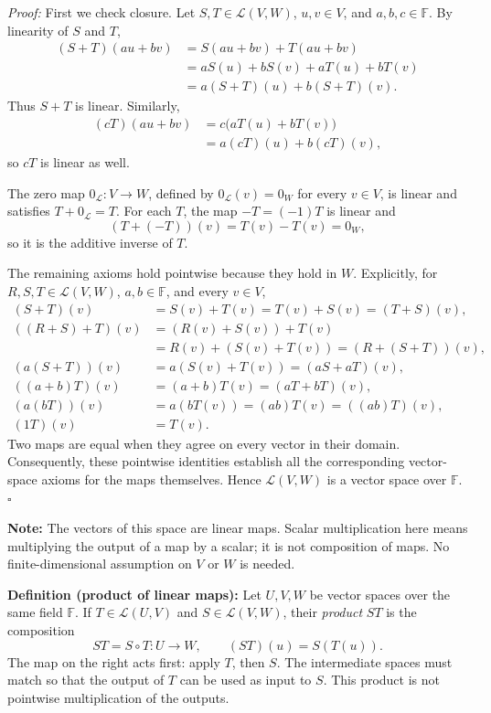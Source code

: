 \documentclass[a4paper,11pt,abstract=true]{scrartcl}
\theoremstyle{dotlessP}
\theoremstyle{dotlessS}
\theoremstyle{remark}
\theoremstyle{definition}
\begin{document}
\begin{claim_box}
\textit{Proof:} First we check closure. Let $S,T\in\mathcal{L}(V,W)$,
$u,v\in V$, and $a,b,c\in\mathbb{F}$. By linearity of $S$ and $T$,
\[
\begin{aligned}
(S+T)(au+bv)
&=S(au+bv)+T(au+bv)\\
&=aS(u)+bS(v)+aT(u)+bT(v)\\
&=a(S+T)(u)+b(S+T)(v).
\end{aligned}
\]
Thus $S+T$ is linear. Similarly,
\[
\begin{aligned}
(cT)(au+bv)
&=c\bigl(aT(u)+bT(v)\bigr)\\
&=a(cT)(u)+b(cT)(v),
\end{aligned}
\]
so $cT$ is linear as well.

The zero map $0_{\mathcal{L}}:V\longrightarrow W$, defined by
$0_{\mathcal{L}}(v)=0_W$ for every $v\in V$, is linear and satisfies
$T+0_{\mathcal{L}}=T$. For each $T$, the map $-T=(-1)T$ is linear and
\[
(T+(-T))(v)=T(v)-T(v)=0_W,
\]
so it is the additive inverse of $T$.

The remaining axioms hold pointwise because they hold in $W$. Explicitly,
for $R,S,T\in\mathcal{L}(V,W)$, $a,b\in\mathbb{F}$, and every $v\in V$,
\[
\begin{aligned}
(S+T)(v)&=S(v)+T(v)=T(v)+S(v)=(T+S)(v),\\
((R+S)+T)(v)&=(R(v)+S(v))+T(v)\\
&=R(v)+(S(v)+T(v))=(R+(S+T))(v),\\
(a(S+T))(v)&=a(S(v)+T(v))=(aS+aT)(v),\\
((a+b)T)(v)&=(a+b)T(v)=(aT+bT)(v),\\
(a(bT))(v)&=a(bT(v))=(ab)T(v)=((ab)T)(v),\\
(1T)(v)&=T(v).
\end{aligned}
\]
Two maps are equal when they agree on every vector in their domain.
Consequently, these pointwise identities establish all the corresponding
vector-space axioms for the maps themselves. Hence $\mathcal{L}(V,W)$ is
a vector space over $\mathbb{F}$. \hfill$\square$
\end{claim_box}

\begin{claim_box}
\textbf{Note:} The vectors of this space are linear maps.
Scalar multiplication here means multiplying the output of a map by a
scalar; it is not composition of maps. No finite-dimensional assumption
on $V$ or $W$ is needed.
\end{claim_box}

\begin{definition_box}
\textbf{Definition (product of linear maps):} Let $U,V,W$ be vector
spaces over the same field $\mathbb{F}$. If $T\in\mathcal{L}(U,V)$ and
$S\in\mathcal{L}(V,W)$, their \emph{product} $ST$ is the composition
\[
ST=S\circ T:U\longrightarrow W,
\qquad (ST)(u)=S(T(u)).
\]
The map on the right acts first: apply $T$, then $S$. The intermediate
spaces must match so that the output of $T$ can be used as input to $S$.
This product is not pointwise multiplication of the outputs.
\end{definition_box}
\end{document}

